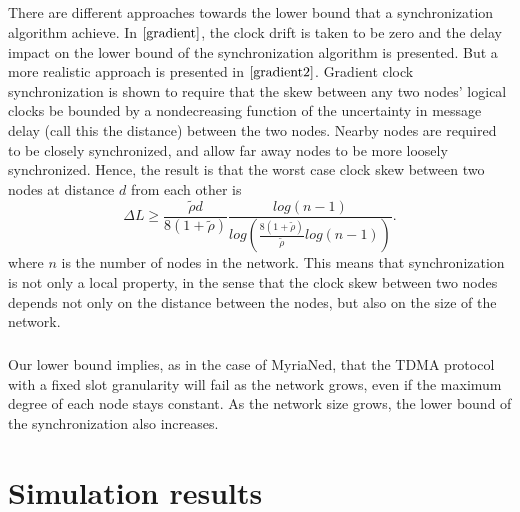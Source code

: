 \documentclass[a4paper,10pt]{report}
\begin{document}
\paragraph*{}
There are different approaches towards the lower bound that a synchronization algorithm achieve. In $\cite{gradient}$, the clock drift is taken to be zero and the delay impact on the lower bound of the synchronization algorithm is presented. But a more realistic approach is presented in $\cite{gradient2}$. Gradient clock synchronization is shown to require that the skew between any two nodes' logical clocks be
bounded by a nondecreasing function of the uncertainty in message delay (call this the distance) between the two nodes. Nearby nodes
are required to be closely synchronized, and allow far away nodes to be more loosely synchronized. Hence, the result is that the worst
case clock skew between two nodes at distance $d$ from each other is
\begin{equation}
\Delta L \geq \frac{\tilde \rho d}{8(1+\tilde \rho)}\frac{log(n-1)}{log(\frac{8(1+\tilde \rho)}{\tilde \rho}log(n-1))}.
\end{equation}
where $n$ is the number of nodes in the network. This means that synchronization is not only a local property, in the sense that the clock skew between two nodes depends not only on the distance between the nodes, but also on the size of the network. \paragraph*{}
Our lower bound implies, as in the case of MyriaNed, that the TDMA protocol with a fixed slot granularity will fail as the network grows, even if the maximum degree of each node stays constant. As the network size grows, the lower bound of the synchronization also increases.
\chapter{Simulation results}
\end{document}
